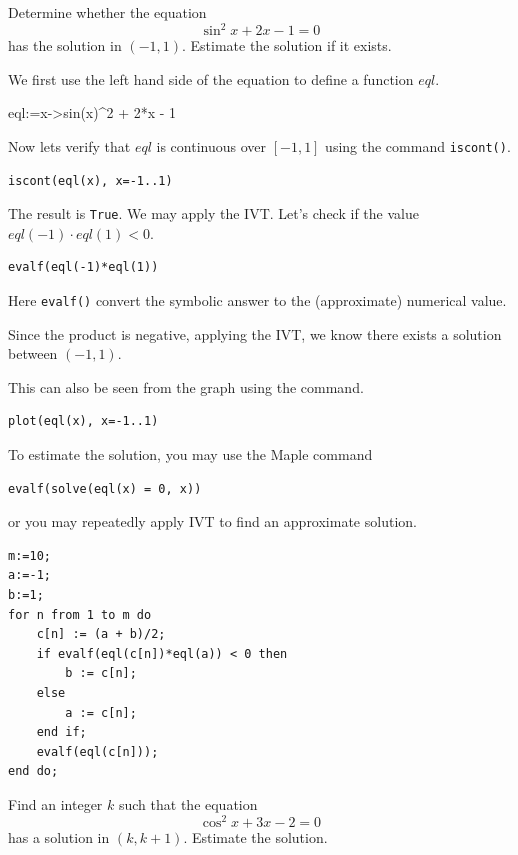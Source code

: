 \documentclass[]{book}
\theoremstyle{definition}
\theoremstyle{definition}
\theoremstyle{definition}
\theoremstyle{remark}
\let\BeginKnitrBlock\begin \let\EndKnitrBlock\end
\begin{document}
\BeginKnitrBlock{example}
\protect\hypertarget{exm:unnamed-chunk-41}{}{\label{exm:unnamed-chunk-41} }
Determine whether the equation
\[
\sin^2x+2x-1=0
\]
has the solution in \((-1, 1)\). Estimate the solution if it exists.
\EndKnitrBlock{example}

\BeginKnitrBlock{solution}
{}
We first use the left hand side of the equation to define a function \(eql\).

eql:=x-\textgreater sin(x)\^{}2 + 2*x - 1

Now lets verify that \(eql\) is continuous over \([-1,1]\) using the command \texttt{iscont()}.

\begin{verbatim}
iscont(eql(x), x=-1..1)
\end{verbatim}

The result is \texttt{True}. We may apply the IVT. Let's check if the value \(eql(-1)\cdot eql(1)<0\).

\begin{verbatim}
evalf(eql(-1)*eql(1))
\end{verbatim}

Here \texttt{evalf()} convert the symbolic answer to the (approximate) numerical value.

Since the product is negative, applying the IVT, we know there exists a solution between \((-1, 1)\).

This can also be seen from the graph using the command.

\begin{verbatim}
plot(eql(x), x=-1..1)
\end{verbatim}

To estimate the solution, you may use the Maple command

\begin{verbatim}
evalf(solve(eql(x) = 0, x))
\end{verbatim}

or you may repeatedly apply IVT to find an approximate solution.

\begin{verbatim}
m:=10;
a:=-1;
b:=1;
for n from 1 to m do
    c[n] := (a + b)/2;
    if evalf(eql(c[n])*eql(a)) < 0 then
        b := c[n];
    else
        a := c[n];
    end if;
    evalf(eql(c[n]));
end do;
\end{verbatim}
\EndKnitrBlock{solution}

\BeginKnitrBlock{exercise}
\protect\hypertarget{exr:unnamed-chunk-43}{}{\label{exr:unnamed-chunk-43} }
Find an integer \(k\) such that the equation
\[
\cos^2x + 3x - 2=0
\]
has a solution in \((k, k+1)\). Estimate the solution.
\EndKnitrBlock{exercise}
\end{document}
